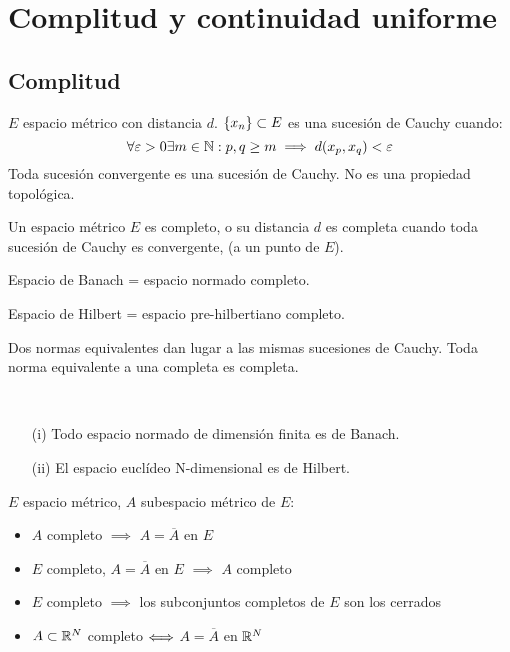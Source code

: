 \chapter{Complitud y continuidad uniforme}
\section{Complitud}

\begin{definicion}
    $E$ espacio métrico con distancia $d$. $\{x_n\} \subset E$ es una sucesión de Cauchy cuando:
    $$\forall \varepsilon > 0 \\ \exists m \in \mathbb N : p,q \geq m \implies d(x_p,x_q) < \varepsilon$$
    Toda sucesión convergente es una sucesión de Cauchy.\newline
    No es una propiedad topológica.
\end{definicion}

\begin{definicion}
    Un espacio métrico $E$ es completo, o su distancia $d$ es completa cuando toda sucesión de Cauchy es convergente, (a un punto de $E$).
\end{definicion}

\begin{ejemplo}
    Espacio de Banach = espacio normado completo.
\end{ejemplo}

\begin{ejemplo}
    Espacio de Hilbert = espacio pre-hilbertiano completo.
\end{ejemplo}

\begin{prop}
    Dos normas equivalentes dan lugar a las mismas sucesiones de Cauchy. 
    Toda norma equivalente a una completa es completa.
\end{prop}

\begin{teo}[Complitud de $\rn$] \\
    \begin{itemize}
        \item[(i)] Todo espacio normado de dimensión finita es de Banach.
        \item[(ii)] El espacio euclídeo N-dimensional es de Hilbert.
    \end{itemize}
\end{teo}

\begin{prop}
    $E$ espacio métrico, $A$ subespacio métrico de $E$:
    \begin{itemize}
        \item $A$ completo $\implies$ $A = \overline{A}$ en $E$
        \item $E$ completo, $A = \overline{A}$ en $E$ $\implies$ $A$ completo
        \item $E$ completo $\implies$ los subconjuntos completos de $E$ son los cerrados
        \item $A\subset \mathbb R^N$ completo $\Longleftrightarrow$ $A = \overline{A}$ en $\rn$
    \end{itemize}
\end{prop}

